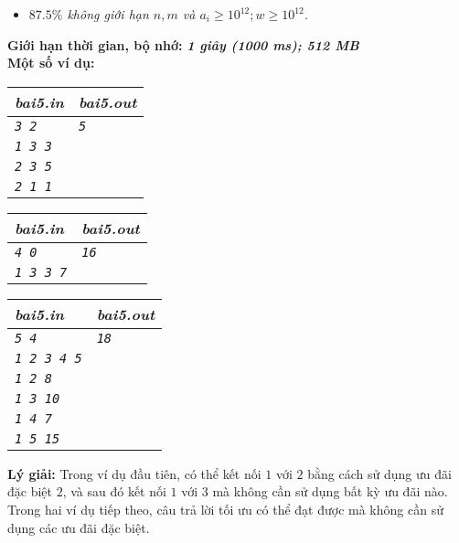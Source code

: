 \begin{ex}
\begin{itemize}
		\item \textit{$87.5\%$ không giới hạn $n,m$ và $a_i \geq 10^{12}; w \geq 10^{12}$. }
	\end{itemize}
		\textbf{Giới hạn thời gian, bộ nhớ: } \textbf{\textit{1 giây (1000 ms); 512 MB}} \\
	\textbf{Một số ví dụ: }
	\begin{center}
		\begin{multicols}{3}
			\begin{tabular}{|l|l|}
				\hline
				\textbf{\textsf{\textit{bai5.in}}} & \textbf{\textsf{\textit{bai5.out}}} \\ %
				\hline
				\textit{\texttt{3 2}} & \textit{\texttt{5}} \\ %
				\textit{\texttt{1 3 3}} & \\
				\textit{\texttt{2 3 5}} & \\
				\textit{\texttt{2 1 1}} & \\
				\hline
			\end{tabular}
			
			\vfil\null \columnbreak
			\begin{tabular}{|l|l|}
				\hline
				\textbf{\textsf{\textit{bai5.in}}} & \textbf{\textsf{\textit{bai5.out}}} \\ %
				\hline
				\textit{\texttt{4 0}} & \textit{\texttt{16}} \\ %
				\textit{\texttt{1 3 3 7}} & \\
				\hline
			\end{tabular}
			\vfil\null \columnbreak
			\begin{tabular}{|l|l|}
				\hline
				\textbf{\textsf{\textit{bai5.in}}} & \textbf{\textsf{\textit{bai5.out}}} \\ %
				\hline
				\textit{\texttt{5 4}} & \textit{\texttt{18}} \\ %
				\textit{\texttt{1 2 3 4 5}} & \\
				\textit{\texttt{1 2 8}} & \\
				\textit{\texttt{1 3 10}} & \\
				\textit{\texttt{1 4 7}} & \\
				\textit{\texttt{1 5 15}} & \\
				\hline
			\end{tabular}
		\end{multicols}
	\end{center}
	
	\textbf{Lý giải: } Trong ví dụ đầu tiên, có thể kết nối $1$ với $2$ bằng cách sử dụng ưu đãi đặc biệt $2$, và sau đó kết nối $1$ với $3$ mà không cần sử dụng bất kỳ ưu đãi nào. \\
	Trong hai ví dụ tiếp theo, câu trả lời tối ưu có thể đạt được mà không cần sử dụng các ưu đãi đặc biệt. 
\end{ex}


